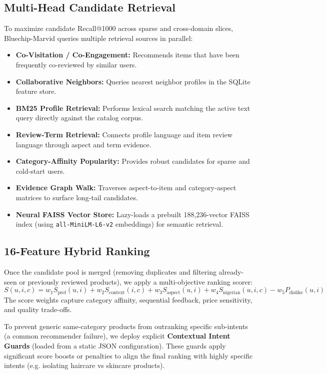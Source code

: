 \documentclass[11pt,a4paper]{article}
\begin{document}
\subsection{Multi-Head Candidate Retrieval}
To maximize candidate Recall@1000 across sparse and cross-domain slices, Bluechip-Marvid queries multiple retrieval sources in parallel:
\begin{itemize}
    \item \textbf{Co-Visitation / Co-Engagement:} Recommends items that have been frequently co-reviewed by similar users.
    \item \textbf{Collaborative Neighbors:} Queries nearest neighbor profiles in the SQLite feature store.
    \item \textbf{BM25 Profile Retrieval:} Performs lexical search matching the active text query directly against the catalog corpus.
    \item \textbf{Review-Term Retrieval:} Connects profile language and item review language through aspect and term evidence.
    \item \textbf{Category-Affinity Popularity:} Provides robust candidates for sparse and cold-start users.
    \item \textbf{Evidence Graph Walk:} Traverses aspect-to-item and category-aspect matrices to surface long-tail candidates.
    \item \textbf{Neural FAISS Vector Store:} Lazy-loads a prebuilt 188,236-vector FAISS index (using \texttt{all-MiniLM-L6-v2} embeddings) for semantic retrieval.
\end{itemize}

\subsection{16-Feature Hybrid Ranking}
Once the candidate pool is merged (removing duplicates and filtering already-seen or previously reviewed products), we apply a multi-objective ranking scorer:
\begin{equation}
S(u, i, c) = w_1 S_{\text{pref}}(u, i) + w_2 S_{\text{context}}(i, c) + w_3 S_{\text{aspect}}(u, i) + w_4 S_{\text{nigerian}}(u, i, c) - w_5 P_{\text{dislike}}(u, i)
\end{equation}
The score weights capture category affinity, sequential feedback, price sensitivity, and quality trade-offs. 

To prevent generic same-category products from outranking specific sub-intents (a common recommender failure), we deploy explicit \textbf{Contextual Intent Guards} (loaded from a static JSON configuration). These guards apply significant score boosts or penalties to align the final ranking with highly specific intents (e.g. isolating haircare vs skincare products).
\end{document}
